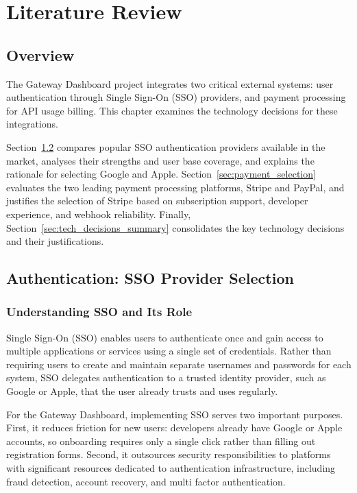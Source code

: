 \chapter{Literature Review}
\label{chap:literature_review}

\section{Overview}

The Gateway Dashboard project integrates two critical external systems: user authentication through Single Sign-On (SSO) providers, and payment processing for API usage billing. This chapter examines the technology decisions for these integrations.

Section~\ref{sec:sso_selection} compares popular SSO authentication providers available in the market, analyses their strengths and user base coverage, and explains the rationale for selecting Google and Apple. Section~\ref{sec:payment_selection} evaluates the two leading payment processing platforms, Stripe and PayPal, and justifies the selection of Stripe based on subscription support, developer experience, and webhook reliability. Finally, Section~\ref{sec:tech_decisions_summary} consolidates the key technology decisions and their justifications.

\section{Authentication: SSO Provider Selection}
\label{sec:sso_selection}

\subsection{Understanding SSO and Its Role}

Single Sign-On (SSO) enables users to authenticate once and gain access to multiple applications or services using a single set of credentials. Rather than requiring users to create and maintain separate usernames and passwords for each system, SSO delegates authentication to a trusted identity provider, such as Google or Apple, that the user already trusts and uses regularly.

For the Gateway Dashboard, implementing SSO serves two important purposes. First, it reduces friction for new users: developers already have Google or Apple accounts, so onboarding requires only a single click rather than filling out registration forms. Second, it outsources security responsibilities to platforms with significant resources dedicated to authentication infrastructure, including fraud detection, account recovery, and multi factor authentication.

